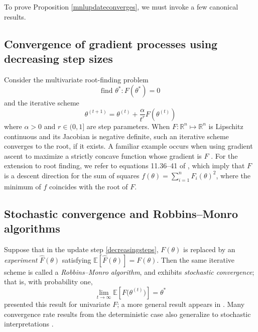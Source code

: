 \documentclass[preprint,12pt,authoryear]{elsarticle}
\begin{document}
To prove Proposition \ref{mnlupdateconverges}, we must invoke a few canonical results.

\subsection{Convergence of gradient processes using decreasing step sizes}
Consider the multivariate root-finding problem 
\begin{equation}\text{find } \theta^*: F(\theta^*) = 0\end{equation}
and the iterative scheme 
\begin{equation} \label{decreasingsteps}
\theta^{(t+1)} = \theta^{(t)} + \frac{\alpha}{t^r} F\left(\theta^{(t)} \right)
\end{equation}
where $\alpha >0$ and $r \in (0, 1]$ are step parameters. When $F: \mathbb{R}^n \mapsto \mathbb{R}^n$ is Lipschitz continuous and its Jacobian is negative definite, such an iterative scheme converges to the root, if it exists. A familiar example occurs when using gradient ascent to maximize a strictly concave function whose gradient is $F$ \cite[e.g.][prop. 1.2.4]{bertsekas1999}. For the extension to root finding, we refer to equations 11.36--41 of \cite{nocedal2006}, which imply that $F$ is a descent direction for the sum of squares $f(\theta) = \sum_{i=1}^n F_i(\theta)^2$, where the minimum of $f$ coincides with the root of $F$.

\subsection{Stochastic convergence and Robbins--Monro algorithms}
Suppose that in the update step \eqref{decreasingsteps},  $F(\theta)$ is replaced by an \emph{experiment} $\hat F(\theta)$ satisfying $\mathbb{E}\left[\hat F(\theta)\right] = F(\theta)$. Then the same iterative scheme is called a \emph{Robbins--Monro algorithm}, and exhibits \emph{stochastic convergence}; that is, with probability one,
\begin{equation}\lim_{t\to \infty} \mathbb{E}\left[F\bigl(\theta^{(t)}\bigr)\right] = \theta^*\end{equation}
\cite{robbinsmonro1951} presented this result for univariate $F$; a more general result appears in \cite{tsitsiklis1994}. Many convergence rate results from the deterministic case also generalize to stochastic interpretations \cite[][\S10.4]{kushner1997}.

\end{document}
